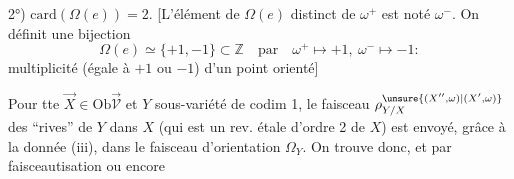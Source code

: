 2°) $\mathrm{card}(\Omega(e))=2$. [L'élément de $\Omega(e)$ distinct de $\omega^+$ est noté $\omega^-$. On définit une bijection
\[
\Omega(e)\simeq\{+1,-1\}\subset\mathbb Z\quad\text{par}\quad\omega^+\mapsto+1,\ \omega^-\mapsto-1:
\]
multiplicité (égale à $+1$ ou $-1$) d'un point orienté]


 Pour tte $\vec X\in\mathrm{Ob}\vec{\mathcal V}$ et $Y$ sous-variété de codim 1, le faisceau $\rho_{Y/X}^{\unsure{(X'',\omega)|(X',\omega)}}$ des ``rives'' de $Y$ dans $X$ (qui est un rev. étale d'ordre 2 de $X$) est envoyé, grâce à la donnée (iii), dans le faisceau d'orientation $\Omega_Y$. On trouve donc, 
et par faisceautisation
ou encore
